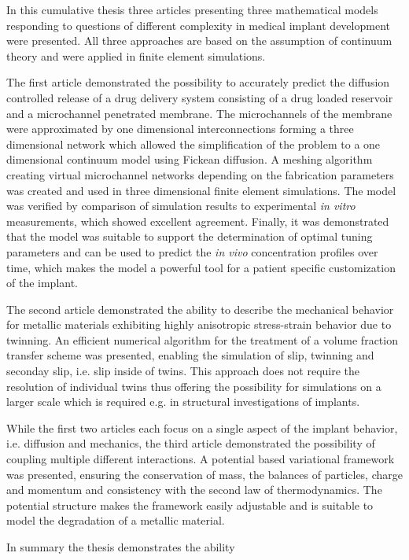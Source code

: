 In this cumulative thesis three articles presenting three mathematical models responding to questions of different complexity in medical implant development were presented. All three approaches are based on the assumption of continuum theory and were applied in finite element simulations. 

The first article demonstrated the possibility to accurately predict the diffusion controlled release of a drug delivery system consisting of a drug loaded reservoir and a microchannel penetrated membrane. The microchannels of the membrane were approximated by one dimensional interconnections forming a three dimensional network which allowed the simplification of the problem to a one dimensional continuum model using Fickean diffusion. A meshing algorithm creating virtual microchannel networks depending on the fabrication parameters was created and used in three dimensional finite element simulations. The model was verified by comparison of simulation results to experimental \textit{in vitro} measurements, which showed excellent agreement. Finally, it was demonstrated that the model was suitable to support the determination of optimal tuning parameters and can be used to predict the \textit{in vivo} concentration profiles over time, which makes the model a powerful tool for a patient specific customization of the implant.

The second article demonstrated the ability to describe the mechanical behavior for metallic materials exhibiting highly anisotropic stress-strain behavior due to twinning. An efficient numerical algorithm for the treatment of a volume fraction transfer scheme was presented, enabling the simulation of slip, twinning and seconday slip, i.e. slip inside of twins. This approach does not require the resolution of individual twins thus offering the possibility for simulations on a larger scale which is required e.g. in structural investigations of implants. 

While the first two articles each focus on a single aspect of the implant behavior, i.e. diffusion and mechanics, the third article demonstrated the possibility of coupling multiple different interactions. A potential based variational framework was presented, ensuring the conservation of mass, the balances of particles, charge and momentum and consistency with the second law of thermodynamics. The potential structure makes the framework easily adjustable and is suitable to model the degradation of a metallic material. 

In summary the thesis demonstrates the ability 